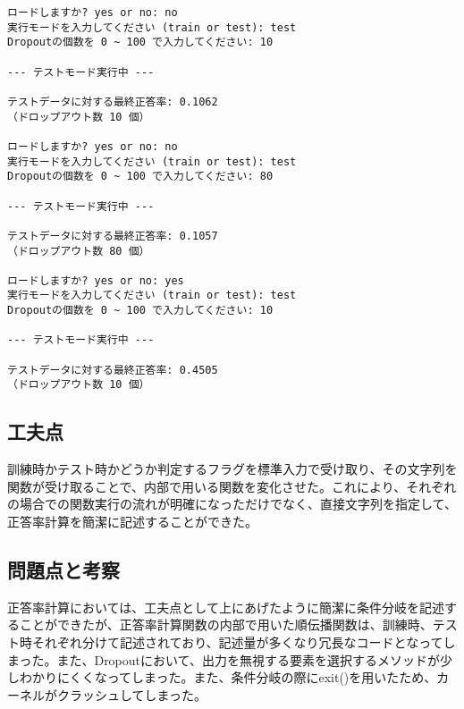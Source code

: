 \documentclass[11px,a4,dvipdfmx]{jsarticle}
\begin{document}
\begin{verbatim}
ロードしますか? yes or no: no
実行モードを入力してください (train or test): test
Dropoutの個数を 0 ~ 100 で入力してください: 10

--- テストモード実行中 ---

テストデータに対する最終正答率: 0.1062
（ドロップアウト数 10 個）

ロードしますか? yes or no: no
実行モードを入力してください (train or test): test
Dropoutの個数を 0 ~ 100 で入力してください: 80

--- テストモード実行中 ---

テストデータに対する最終正答率: 0.1057
（ドロップアウト数 80 個）

ロードしますか? yes or no: yes
実行モードを入力してください (train or test): test
Dropoutの個数を 0 ~ 100 で入力してください: 10

--- テストモード実行中 ---

テストデータに対する最終正答率: 0.4505
（ドロップアウト数 10 個）
\end{verbatim}
\subsection{工夫点}
訓練時かテスト時かどうか判定するフラグを標準入力で受け取り、その文字列を関数が受け取ることで、内部で用いる関数を変化させた。これにより、それぞれの場合での関数実行の流れが明確になっただけでなく、直接文字列を指定して、正答率計算を簡潔に記述することができた。
\subsection{問題点と考察}
正答率計算においては、工夫点として上にあげたように簡潔に条件分岐を記述することができたが、正答率計算関数の内部で用いた順伝播関数は、訓練時、テスト時それぞれ分けて記述されており、記述量が多くなり冗長なコードとなってしまった。また、Dropoutにおいて、出力を無視する要素を選択するメソッドが少しわかりにくくなってしまった。また、条件分岐の際にexit()を用いたため、カーネルがクラッシュしてしまった。
\end{document}
